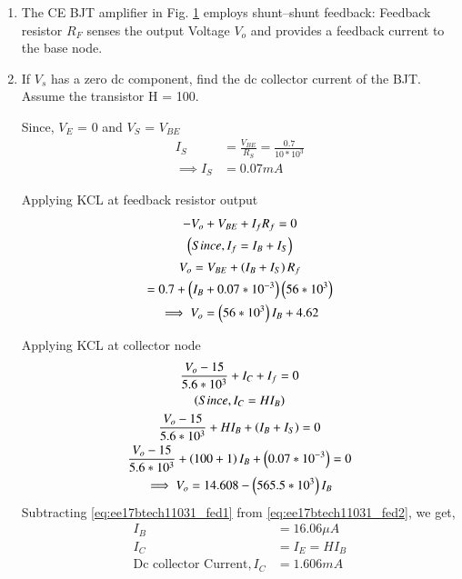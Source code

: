 \begin{enumerate}[label=\thesection.\arabic*.,ref=\thesection.\theenumi]

\item The CE BJT amplifier in Fig. \ref{fig:Original ckt} employs shunt–shunt feedback: Feedback resistor $R_{F}$ senses the output Voltage $V_{o}$ and provides a feedback current to the base node.

 \begin{figure}[!ht]
 	\begin{center}
 			\resizebox{\columnwidth}{!}{}
 	\end{center}
 \caption{}
 \label{fig:Original ckt}
 \end{figure}

\item If $V_{s}$ has a zero dc component, find the dc collector current of the BJT. Assume the transistor H = 100.

 \solution 
 Since, $V_{E}$ = 0 and $V_{S}$ = $V_{BE}$
 \begin{align}
    I_{S} &= \frac{V_{BE}}{R_{S}}
     = \frac{0.7}{10 * 10^3}\\
    \implies I_{S} &= 0.07 mA
 \end{align}
 
 Applying KCL at feedback resistor output
\begin{multline}
    -V_{o} + V_{BE} + I_{f}R_{f} = 0\\
    \text{\brak{Since, I_{f} = I_{B} + I_{S}}}\\
    V_{o} = V_{BE} + \brak{I_{B} + I_{S}}R_{f}  \\
     = 0.7 + \brak{I_{B} + 0.07*10^{-3}}\brak{56*10^3}\\
    \implies V_{o}= \brak{56*10^3}I_{B} + 4.62
     \label{eq:ee17btech11031_fed1}
\end{multline}

 Applying KCL at collector node
 \begin{multline}
    \frac{V_{o} - 15}{5.6*10^3} + I_{C} + I_{f} = 0\\
     \text{\brak{Since,I_{C} = H I_{B}}}\\
     \frac{V_{o} - 15}{5.6*10^3} + H I_{B} + \brak{I_{B} + I_{S}} = 0\\
     \frac{V_{o} - 15}{5.6*10^3} + \brak{100 + 1}I_{B} + \brak{0.07*10^{-3}} = 0\\
     \implies V_{o} = 14.608 - \brak{565.5*10^3}I_{B} 
     \label{eq:ee17btech11031_fed2}
 \end{multline}
 Subtracting \ref{eq:ee17btech11031_fed1} from \ref{eq:ee17btech11031_fed2}, we get,
 \begin{align}
     I_{B} &= 16.06  \mu A\\
     I_{C} &= I_{E} = H I_{B}\\
     \text{Dc collector Current},  
     I_{C} &= 1.606  mA
 \end{align}
 

\end{enumerate}
